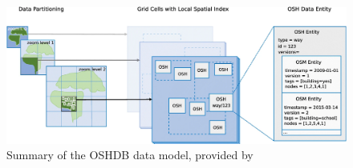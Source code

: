 \begin{figure} %
    \centering %
    \includegraphics[width = \textwidth]{Images/oshdb.PNG} %
    \caption{Summary of the OSHDB data model, provided by \textcite{raifer_oshdb_2019}} %
    \label{fig:oshdb} %
\end{figure}




    


